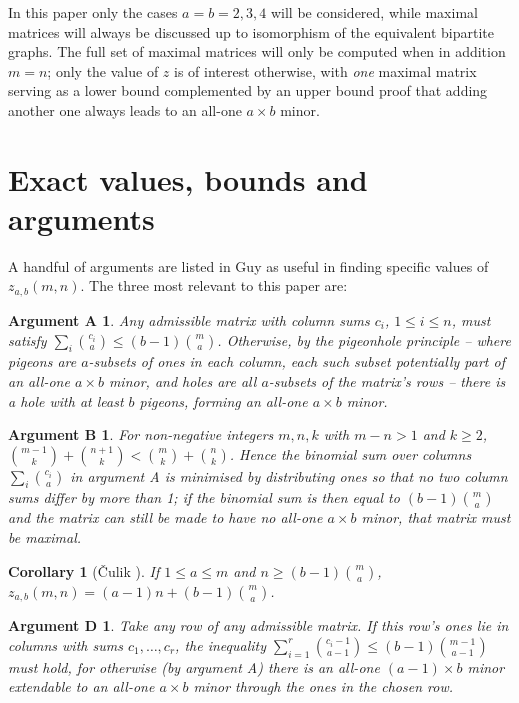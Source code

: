 \documentclass[10pt,a4paper]{article}
\newtheorem{corollary}[theorem]{Corollary}
\newtheorem*{argA}{Argument A}
\newtheorem*{argB}{Argument B}
\newtheorem*{argD}{Argument D}
\theoremstyle{definition}
\begin{document}
	In this paper only the cases $a=b=2,3,4$ will be considered, while maximal matrices will always be discussed up to isomorphism of the equivalent bipartite graphs. The full set of maximal matrices will only be computed when in addition $m=n$; only the value of $z$ is of interest otherwise, with \textit{one} maximal matrix serving as a lower bound complemented by an upper bound proof that adding another one always leads to an all-one $a\times b$ minor.
	
	\section{Exact values, bounds and arguments}\label{sec:eba}
	
	A handful of arguments are listed in Guy \cite{guy} as useful in finding specific values of $z_{a,b}(m,n)$. The three most relevant to this paper are:
	\begin{argA}
		Any admissible matrix with column sums $c_i$, $1\le i\le n$, must satisfy $\sum_i\binom{c_i}a\le(b-1)\binom ma$. Otherwise, by the pigeonhole principle -- where pigeons are $a$-subsets of ones in each column, each such subset potentially part of an all-one $a\times b$ minor, and holes are all $a$-subsets of the matrix's rows -- there is a hole with at least $b$ pigeons, forming an all-one $a\times b$ minor.
	\end{argA}
	\begin{argB}
		For non-negative integers $m,n,k$ with $m-n>1$ and $k\ge2$, $\binom{m-1}k+\binom{n+1}k<\binom mk+\binom nk$. Hence the binomial sum over columns $\sum_i\binom{c_i}a$ in argument A is minimised by distributing ones so that no two column sums differ by more than 1; if the binomial sum is then equal to $(b-1)\binom ma$ and the matrix can still be made to have no all-one $a\times b$ minor, that matrix must be maximal.
	\end{argB}
	\begin{corollary}[Čulik \cite{culik}]
		If $1\le a\le m$ and $n\ge(b-1)\binom ma$, $z_{a,b}(m,n)=(a-1)n+(b-1)\binom ma$.
	\end{corollary}
	\begin{argD}
		Take any row of any admissible matrix. If this row's ones lie in columns with sums $c_1,\dots,c_r$, the inequality $\sum_{i=1}^r\binom{c_i-1}{a-1}\le(b-1)\binom{m-1}{a-1}$ must hold, for otherwise (by argument A) there is an all-one $(a-1)\times b$ minor extendable to an all-one $a\times b$ minor through the ones in the chosen row.
	\end{argD}
	
\end{document}
